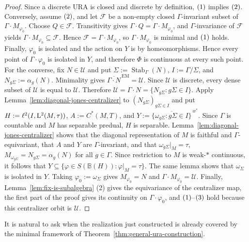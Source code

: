 \documentclass[12pt]{amsart} %
\theoremstyle{plain}
\theoremstyle{definition}
\newcommand{\B}{\mathbb{B}}
\newcommand{\LL}{{\rm L}}
\begin{document}
\begin{proof}
Since a discrete URA is
closed and discrete by definition, ${\rm(1)}$ implies ${\rm(2)}$.
Conversely, assume ${\rm(2)}$, and let $\mathcal F$ be a non-empty closed
$\Gamma$-invariant subset of $\Gamma\cdot M_{\varphi_0}$. Choose
$Q\in\mathcal F$. Transitivity gives
$\Gamma\cdot Q=\Gamma\cdot M_{\varphi_0}$, and $\Gamma$-invariance of
$\mathcal F$ yields $\Gamma\cdot M_{\varphi_0}\subseteq\mathcal F$.
Hence $\mathcal F=\Gamma\cdot M_{\varphi_0}$, so
$\Gamma\cdot M_{\varphi_0}$ is minimal and ${\rm(1)}$ holds. Finally,
$\varphi_0$ is isolated and the action on $Y$ is by homeomorphisms. Hence
every point of $\Gamma\cdot\varphi_0$ is isolated in
$Y$, and therefore $\Phi$ is continuous at every such point.
\medskip
\noindent For the converse, fix $N\in\mathcal U$ and put
$\Sigma:=\operatorname{Stab}_\Gamma(N)$, $I:=\Gamma/\Sigma$, and
$N_{g\Sigma}:=\alpha_g(N)$. Minimality gives $\overline{\Gamma\cdot N}^{\,\mathrm{EM}}=\mathcal U$.
Since $\mathcal U$ is discrete, every dense subset of $\mathcal U$ is
equal to $\mathcal U$. Therefore $\mathcal U=\Gamma\cdot N=\{N_{g\Sigma}:g\Sigma\in I\}$. Apply
Lemma~\ref{lem:diagonal-jones-centralizer} to
$(N_{g\Sigma})_{g\Sigma\in I}$ and put
$H:=\ell^2(I,\LL^2(M,\tau))$, $A:=C^*(M,T)$, and
$Y:=\overline{\{\omega_{g\Sigma}:g\Sigma\in I\}}^{\,w^*}$. Since
$\Gamma$ is countable and $M$ has separable predual, $H$ is separable.
Lemma~\ref{lem:diagonal-jones-centralizer} shows that the diagonal
representation of $M$ is faithful and $\Gamma$-equivariant, that $A$ and
$Y$ are $\Gamma$-invariant, and that $\omega_{g\Sigma}|_M=\tau$, $M_{\omega_{g\Sigma}}=N_{g\Sigma}=\alpha_g(N)$ for all $g\in\Gamma$. Since restriction to $M$ is weak-$*$ continuous, it follows that $Y\subseteq\{\varphi\in S(\B(H)):\varphi|_M=\tau\}$. The same lemma shows that $\omega_\Sigma$ is isolated in $Y$. Taking
$\varphi_0:=\omega_\Sigma$ gives
$M_{\varphi_0}=N$ and $\Gamma\cdot M_{\varphi_0}=\mathcal U$. Finally,
Lemma~\ref{lem:fix-is-subalgebra} \rm(2) gives the equivariance of the
centralizer map, the first part of the proof gives its continuity on
$\Gamma\cdot\varphi_0$, and ${\rm(1)}$--${\rm(3)}$ hold because this
centralizer orbit is $\mathcal U$.
\end{proof}

\noindent It is natural to ask when the realization just constructed is already
covered by the minimal framework of Theorem~\ref{thm:general-ura-construction}.
\end{document}
